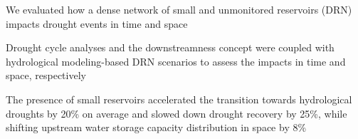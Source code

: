 \documentclass[draft]{agujournal2019}
\begin{document}

\begin{keypoints}
\item We evaluated how a dense network of small and unmonitored reservoirs (DRN) impacts drought events in time and space
\item Drought cycle analyses and the downstreamness concept were coupled with hydrological modeling-based DRN scenarios to assess the impacts in time and space, respectively
\item The presence of small reservoirs accelerated the transition towards hydrological droughts by 20\% on average and slowed down drought recovery by 25\%, while shifting upstream water storage capacity distribution in space by 8\%
\end{keypoints}

%
%

%
%
\end{document}
